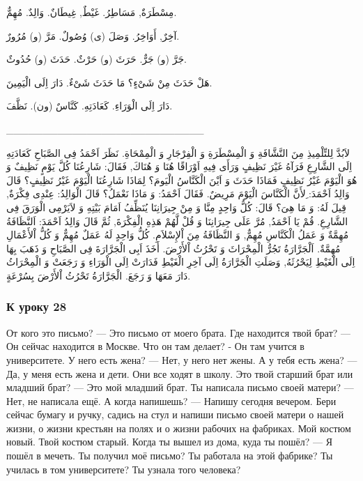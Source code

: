 \documentclass[a5paper]{article}
\begin{document}
مِسْطَرَةٌ, مَسَاطِرُ. غَيْطٌ, غِيطَانٌ. وَالِدٌ. مُهِمٌّ. 

آخِرٌ, أَوَاخِرُ. وَصَلَ (ى) وُصُولٌ. مَرَّ (و) مُرُورٌ. 

جَرَّ (و) جَرٌّ. حَرَثَ (و) حَرْثٌ. حَدَثَ (و) حُدُوثٌ. 

هَلْ حَدَثَ مِنْ شَىْءٍ؟ مَا حَدَثَ شَىْءٌ. دَارَ اِلَى الْيَمِينَ. 

دَارَ اِلَى الْوَرَاءِ. كَعَادَتِهِ. كَنَّاسٌ (ون). نَظَّفَ.

\_\_\_\_\_\_\_\_\_\_\_\_\_\_\_\_\_\_\_\_\_\_\_\_\_\_\_

لاَبُدَّ لِلتِّلْمِيذِ مِنَ النَّشَّافَةِ وَ الْمِسْطَرَةِ وَ الْفِرْجَارِ وَ الْمِمْحَاةِ. نَظَرَ اَحْمَدُ فِى الصَّبَاحِ كَعَادَتِهِ اِلَى الشَّارِعِ فَرَآهُ غَيْرَ نَظِيفٍ وَرَأَى فِيهِ اَوْرَاقًا هُنَا وَ هُنَاكَ, فَقَالَ: شَارِعُنَا كُلَّ يَوْمٍ نَظِيفٌ وَ هُوَ الْيَوْمَ غَيْرُ نَظِيفٍ فَمَاذَا حَدَثَ وَ اَيْنَ الْكَنَّاسُ الْيَومَ؟ لِمَاذَا شَارِعُنَا الْيَوْمَ غَيْرُ نَظِيفٍ؟ قَالَ وَالِدُ اَحْمَدَ: ِلأَنَّ الْكَنَّاسَ الْيَوْمَ مَرِيضٌ. فَقَالَ اَحْمَدُ: وَ مَاذَا نَعْمَلُ؟ قَالَ الْوَالِدُ: عِنْدِى فِكْرَةٌ, قِيلَ لَهُ: وَ مَا هِىَ؟ قَالَ: كُلُّ وَاحِدٍ مِنَّا وَ مِنْ جِيرَانِنَا يُنَظِّفُ اَمَامَ بَيْتِهِ وَ لاَيَرْمِى الْوَرَقَ فِى الشَّارِعِ. قُمْ يَا اَحْمَدُ, مُرَّ عَلَى جِيرَانِنَا وَ قُلْ لَّهُمْ هَذِهِ الْفِكْرَةَ, ثُمَّ قَالَ وَالِدُ اَحْمَدَ: اَلنَّظَافَةُ مُهِمَّةٌ وَ عَمَلُ الْكَنَّاسِ مُهِمٌّ, وَ النَّظَافَةُ مِنَ اْلإِسْلاَمِ. كُلُّ وَاحِدٍ لَهُ عَمَلٌ مُهِمٌّ وَ كُلُّ اْلأَعْمَالِ مُهِمَّةٌ. اَلْجَرَّارَةُ تَجُرُّ الْمِحْرَاثَ وَ تَحْرُثُ اْلأَرْضَ. أَخَذَ اَبِى الْجَرَّارَةَ فِى الصَّبَاحِ وَ ذَهَبَ بِهَا اِلَى الْغَيْطِ لِيَحْرُثَهُ, وَصَلَتِ الْجَرَّارَةُ اِلَى آخِرِ الْغَيْطِ فَدَارَتْ اِلَى الْوَرَاءِ وَ رَجَعَتْ وَ الْمِحْرَاثُ دَارَ مَعَهَا وَ رَجَعَ. الْجَرَّارَةُ تَحْرُثُ اْلأَرْضَ بِسُرْعَةٍ.

\subsubsection{К уроку 28}
От кого это письмо? — Это письмо от моего брата. Где находится твой брат? — Он сейчас находится в Москве. Что он там делает? - Он там учится в университете. У него есть жена? — Нет, у него нет жены. А у тебя есть жена? — Да, у меня есть жена и дети. Они все ходят в школу. Это твой старший брат или младший брат? — Это мой младший брат. Ты написала письмо своей матери? — Нет, не написала ещё. А когда напишешь? — Напишу сегодня вечером. Бери сейчас бумагу и ручку, садись на стул и напиши письмо своей матери о нашей жизни, о жизни крестьян на полях и о жизни рабочих на фабриках. Мой костюм новый. Твой костюм старый. Когда ты вышел из дома, куда ты пошёл? — Я пошёл в мечеть. Ты получил моё письмо? Ты работала на этой фабрике? Ты училась в том университете? Ты узнала того человека?
\end{document}

